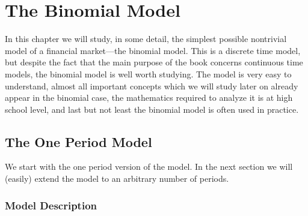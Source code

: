 \documentclass{Base}
\begin{document}
\chapter{The Binomial Model}\label{bin}

In this chapter we will study, in some detail, the simplest
possible nontrivial model of a financial market---the binomial model. This
is a discrete time model, but despite the fact that the main purpose of the
book concerns continuous time models, the binomial model is well worth
studying. The model is very easy to understand, almost all important
concepts which we will study later on already  appear in the binomial case,
the mathematics required to analyze it is at high school level, and last but
not least the binomial model is often used in practice.


\section{The One Period Model} \label{opm}

We start with the one period version of the model. In the next
section we will  (easily) extend the model to an arbitrary number of
periods.

\subsection{Model Description}\label{md}
\end{document}
